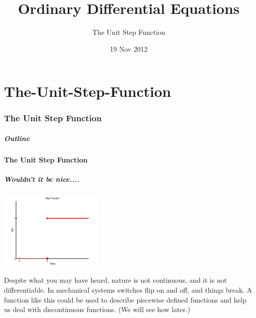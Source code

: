 \part{The-Unit-Step-Function}
\section{The Unit Step Function}

\title{Ordinary Differential Equations}
\subtitle{The Unit Step Function}
\date{19 Nov 2012}

\begin{frame}
  \titlepage
\end{frame}

\begin{frame}
  \frametitle{Outline}
\end{frame}


\subsection{The Unit Step Function}


\begin{frame}
  \frametitle{Wouldn't it be nice....}

  \centerline{\includegraphics[width=5cm]{img/unitStepAta}}

  {%

    Despite what you may have heard, nature is not continuous, and it
    is not differentiable.  In mechanical systems switches flip on and
    off, and things break. A function like this could be used to
    describe piecewise defined functions and help us deal with
    discontinuous functions. (We will see how later.)

  }

\end{frame}

